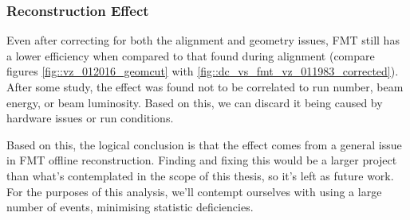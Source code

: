 \subsubsection{Reconstruction Effect}
    Even after correcting for both the alignment and geometry issues, FMT still has a lower efficiency when compared to that found during alignment (compare figures \ref{fig::vz_012016_geomcut} with \ref{fig::dc_vs_fmt_vz_011983_corrected}).
    After some study, the effect was found not to be correlated to run number, beam energy, or beam luminosity.
    Based on this, we can discard it being caused by hardware issues or run conditions.

    Based on this, the logical conclusion is that the effect comes from a general issue in FMT offline reconstruction.
    Finding and fixing this would be a larger project than what's contemplated in the scope of this thesis, so it's left as future work.
    For the purposes of this analysis, we'll contempt ourselves with using a large number of events, minimising statistic deficiencies.
